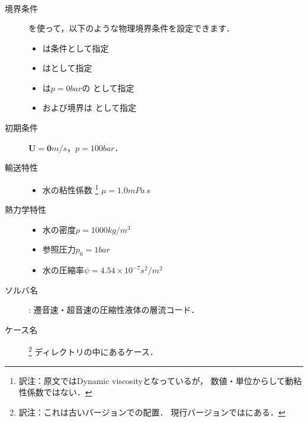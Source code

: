 \begin{description}
\begin{itemize}
\begin{align}
                   \end{align}
            \end{itemize}
 \item[境界条件] を使って，以下のような物理境界条件を設定できます．
            \begin{itemize}
             \item {}は条件として指定
             \item {}はとして指定
             \item {}は$p = 0 \unit{bar}$の
                   として指定
             \item {}および境界は
                   として指定
            \end{itemize}
 \item[初期条件] $\bm{U} = \bm{0} \unit{m/s}$，$p = 100 \unit{bar}$．
 \item[輸送特性] \mbox{}
            \begin{itemize}
             \item 水の粘性係数%
\footnote{訳注：原文ではDynamic viscosityとなっているが，
数値・単位からして動粘性係数ではない．}%
                   $\mu = 1.0 \unit{mPa\,s}$
            \end{itemize}
 \item[熱力学特性] \mbox{}
            \begin{itemize}
             \item 水の密度$\rho = 1000 \unit{kg/m^{3}}$
             \item 参照圧力$p_{0} = 1 \unit{bar}$
             \item 水の圧縮率$\psi = 4.54 \times 10^{-7} \unit{s^{2}/m^{2}}$
            \end{itemize}
 \item[ソルバ名] : 遷音速・超音速の圧縮性液体の層流コード．
 \item[ケース名] %
\footnote{訳注：これは古いバージョンでの配置．
現行バージョンではにある．}%
            ディレクトリの中にあるケース．
\end{description}


